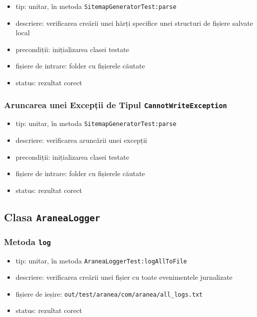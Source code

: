 \documentclass[12pt]{article}
\begin{document}
\begin{itemize}
    \item tip: unitar, în metoda \texttt{SitemapGeneratorTest:parse}
    \item descriere: verificarea creării unei hărți specifice unei structuri de fișiere salvate local
    \item precondiții: inițializarea clasei testate
    \item fișiere de intrare: folder cu fișierele căutate
    \item status: rezultat corect
\end{itemize}

\subsubsection{Aruncarea unei Excepții de Tipul \texttt{CannotWriteException}}

\begin{itemize}
    \item tip: unitar, în metoda \texttt{SitemapGeneratorTest:parse}
    \item descriere: verificarea aruncării unei excepții 
    \item precondiții: inițializarea clasei testate
    \item fișiere de intrare: folder cu fișierele căutate
    \item status: rezultat corect
\end{itemize}

\subsection{Clasa \texttt{AraneaLogger}}

\subsubsection{Metoda \texttt{log}}

\begin{itemize}
    \item tip: unitar, în metoda \texttt{AraneaLoggerTest:logAllToFile}
    \item descriere: verificarea creării unei fișier cu toate evenimentele jurnalizate
    \item fișiere de ieșire: \texttt{out/test/aranea/com/aranea/all_logs.txt}
    \item status: rezultat corect
\end{itemize}
\end{document}
